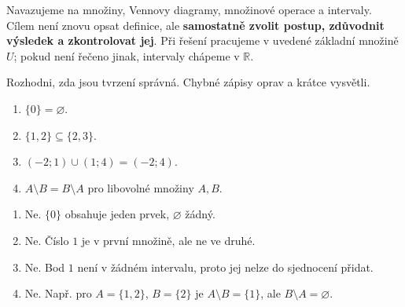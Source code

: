 \documentclass[11pt,a4paper]{article}
\begin{document}
Navazujeme na množiny, Vennovy diagramy, množinové operace a intervaly.
Cílem není znovu opsat definice, ale \textbf{samostatně zvolit postup,
zdůvodnit výsledek a zkontrolovat jej}. Při řešení pracujeme v uvedené
základní množině $U$; pokud není řečeno jinak, intervaly chápeme v $\mathbb R$.


\begin{zadaniReseniBox}[title={Samostatná práce 1},breakable=false]
Rozhodni, zda jsou tvrzení správná. Chybné zápisy oprav a krátce vysvětli.
\begin{enumerate}[label=\alph*)]
\item $\{0\}=\varnothing$.
\item $\{1,2\}\subseteq\{2,3\}$.
\item $(-2;1)\cup(1;4)=(-2;4)$.
\item $A\setminus B=B\setminus A$ pro libovolné množiny $A,B$.
\end{enumerate}
\tcblower
\begin{enumerate}[label=\alph*)]
\item Ne. $\{0\}$ obsahuje jeden prvek, $\varnothing$ žádný.
\item Ne. Číslo $1$ je v první množině, ale ne ve druhé.
\item Ne. Bod $1$ není v žádném intervalu, proto jej nelze do sjednocení přidat.
\item Ne. Např. pro $A=\{1,2\}$, $B=\{2\}$ je
$A\setminus B=\{1\}$, ale $B\setminus A=\varnothing$.
\end{enumerate}
\end{zadaniReseniBox}
\end{document}
